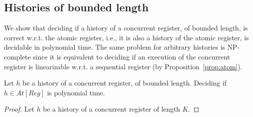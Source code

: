 
\subsection{Histories of bounded length}

We show that deciding if a history of a concurrent register, of bounded length, is correct w.r.t. the atomic register, i.e., it is also a history of the atomic register, is decidable in polynomial time. The same problem for arbitrary histories is NP-complete since it is equivalent to deciding if an execution of the concurrent register is linearizable w.r.t. a sequential register (by Proposition~\ref{prop:atom}).

\begin{theorem}
Let $h$ be a history of a concurrent register, of bounded length. Deciding if $h\in At[Reg]$ is polynomial time.
\end{theorem}
\begin{proof}
Let $h$ be a history of a concurrent register of length $K$. 
\end{proof}